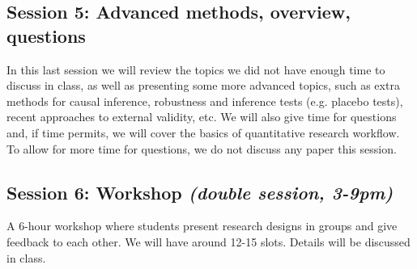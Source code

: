 \documentclass[12pt, a4paper]{article}
\begin{document}
\subsection*{Session 5: Advanced methods, overview, questions}

In this last session we will review the topics we did not have enough time to discuss in class, as well as presenting some more advanced topics, such as extra methods for causal inference, robustness and inference tests (e.g. placebo tests), recent approaches to external validity, etc. We will also give time for questions and, if time permits, we will cover the basics of quantitative research workflow. To allow for more time for questions, we do not discuss any paper this session.

\subsection*{Session 6: Workshop \textit{(double session, 3-9pm)}}

A 6-hour workshop where students present research designs in groups and give feedback to each other. We will have around 12-15 slots. Details will be discussed in class.
\end{document}
